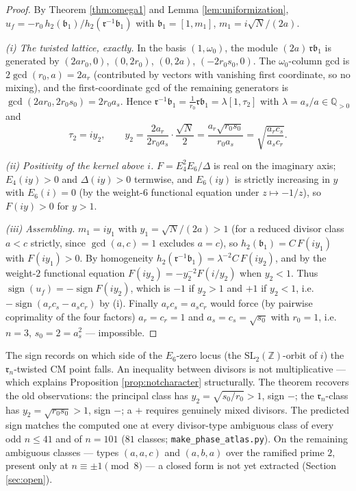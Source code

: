 \documentclass[11pt]{amsart}
\numberwithin{equation}{section}
\theoremstyle{plain}
\theoremstyle{definition}
\theoremstyle{remark}
\newcommand{\Q}{\mathbb{Q}}
\newcommand{\Z}{\mathbb{Z}}
\newcommand{\SL}{\mathrm{SL}}
\newcommand{\idealb}{\mathfrak{b}}
\newcommand{\idealr}{\mathfrak{r}}
\newcommand{\sgn}{\operatorname{sign}}
\newcommand{\lat}[1]{\left[#1\right]}
\begin{document}
\begin{proof}
By Theorem \ref{thm:omega1} and Lemma \ref{lem:uniformization},
$u_f = -r_0\,h_2(\idealb_1)/h_2(\idealr^{-1}\idealb_1)$ with
$\idealb_1 = \lat{1, m_1}$, $m_1 = i\sqrt N/(2a)$.

\emph{(i) The twisted lattice, exactly.}  In the basis $(1,
\omega_0)$, the module $(2a)\,\idealr\idealb_1$ is generated by
$(2ar_0, 0)$, $(0, 2r_0)$, $(0, 2a)$, $(-2r_0s_0, 0)$.  The
$\omega_0$-column gcd is $2\gcd(r_0, a) = 2a_r$ (contributed by
vectors with vanishing first coordinate, so no mixing), and the
first-coordinate gcd of the remaining generators is $\gcd(2ar_0,
2r_0s_0) = 2r_0a_s$.  Hence $\idealr^{-1}\idealb_1 =
\tfrac1{r_0}\idealr\idealb_1 = \lambda\lat{1, \tau_2}$ with $\lambda
= a_s/a \in \Q_{>0}$ and
\[
  \tau_2 = iy_2, \qquad
  y_2 = \frac{2a_r}{2r_0a_s}\cdot\frac{\sqrt N}{2}
  = \frac{a_r\sqrt{r_0s_0}}{r_0a_s}
  = \sqrt{\frac{a_rc_s}{a_sc_r}} .
\]

\emph{(ii) Positivity of the kernel above $i$.}  $F = E_4^2E_6/\Delta$
is real on the imaginary axis; $E_4(iy) > 0$ and $\Delta(iy) > 0$
termwise, and $E_6(iy)$ is strictly increasing in $y$ with $E_6(i) =
0$ (by the weight-$6$ functional equation under $z \mapsto -1/z$), so
$F(iy) > 0$ for $y > 1$.

\emph{(iii) Assembling.}  $m_1 = iy_1$ with $y_1 = \sqrt N/(2a) > 1$
(for a reduced divisor class $a < c$ strictly, since $\gcd(a, c) = 1$
excludes $a = c$), so $h_2(\idealb_1) = C\,F(iy_1)$ with $F(iy_1) >
0$.  By homogeneity $h_2(\idealr^{-1}\idealb_1) =
\lambda^{-2}C\,F(iy_2)$, and by the weight-$2$ functional equation
$F(iy_2) = -y_2^{-2}F(i/y_2)$ when $y_2 < 1$.  Thus
$\sgn(u_f) = -\sgn F(iy_2)$, which is $-1$ if $y_2 > 1$ and $+1$ if
$y_2 < 1$, i.e.\ $-\sgn(a_rc_s - a_sc_r)$ by (i).  Finally $a_rc_s =
a_sc_r$ would force (by pairwise coprimality of the four factors)
$a_r = c_r = 1$ and $a_s = c_s = \sqrt{s_0}$ with $r_0 = 1$, i.e.\
$n = 3$, $s_0 = 2 = a_s^2$ --- impossible.
\end{proof}

The sign records on which side of the $E_6$-zero locus (the
$\SL_2(\Z)$-orbit of $i$) the $\idealr_n$-twisted CM point falls.  An
inequality between divisors is not multiplicative --- which explains
Proposition \ref{prop:notcharacter} structurally.  The theorem
recovers the old observations: the principal class has $y_2 =
\sqrt{s_0/r_0} > 1$, sign $-$; the $\idealr_n$-class has $y_2 =
\sqrt{r_0s_0} > 1$, sign $-$; a $+$ requires genuinely mixed divisors.
The predicted sign matches the computed one at every divisor-type
ambiguous class of every odd $n \le 41$ and of $n = 101$ ($81$
classes; \texttt{make\_phase\_atlas.py}).  On the remaining ambiguous
classes --- types $(a, a, c)$ and $(a, b, a)$ over the ramified prime
$2$, present only at $n \equiv \pm 1 \pmod 8$ --- a closed form is not
yet extracted (Section \ref{sec:open}).
\end{document}
